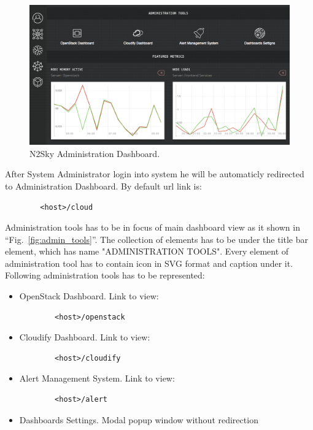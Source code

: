 \begin{figure}[htbp]
\begin{center}
  \includegraphics[width=\linewidth]{components/4/pics/admin_dashboard.png}
  \caption{N2Sky Administration Dashboard.}
  \label{fig:admin_dashboard}
\end{center}
\end{figure}

After System Administrator login into system he will be automaticly redirected to Administration Dashboard. By default url link is:
\begin{lstlisting}
		<host>/cloud
\end{lstlisting}

Administration tools has to be in focus of main dashboard view as it shown in ``Fig.~\ref{fig:admin_tools}''. The collection of elements has to be under the title bar element, which has name "ADMINISTRATION TOOLS". Every element of administration tool has to contain icon in SVG \cite{Cagle2005} format and caption under it. Following administration tools has to be represented: 
\begin{itemize}
\item OpenStack Dashboard. Link to view: 
\begin{lstlisting}
		<host>/openstack
\end{lstlisting}
\item Cloudify Dashboard. Link to view: 
\begin{lstlisting}
		<host>/cloudify
\end{lstlisting}
\item Alert Management System. Link to view: 
\begin{lstlisting}
		<host>/alert
\end{lstlisting}
\item Dashboards Settings. Modal popup window without redirection
\end{itemize}

